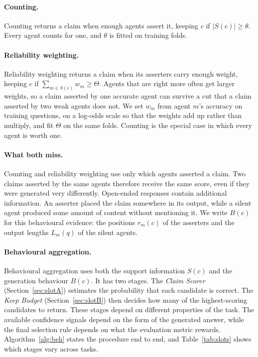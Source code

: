 \documentclass{article}
\begin{document}
\paragraph{Counting.}
Counting returns a claim when enough agents assert it, keeping $c$ if
$|S(c)| \geq \theta$. Every agent counts for one, and $\theta$ is fitted on training
folds.

\paragraph{Reliability weighting.}
Reliability weighting returns a claim when its asserters carry enough weight, keeping
$c$ if $\sum_{m \in S(c)} w_m \geq \Theta$. Agents that are right more often get larger
weights, so a claim asserted by one accurate agent can survive a cut that a claim
asserted by two weak agents does not. We set $w_m$ from agent $m$'s accuracy on training
questions, on a log-odds scale so that the weights add up rather than multiply, and fit
$\Theta$ on the same folds. Counting is the special case in which every agent is
worth one.

\paragraph{What both miss.}
Counting and reliability weighting use only which agents asserted a claim. Two claims
asserted by the same agents therefore receive the same score, even if they were generated
very differently. Open-ended responses contain additional information. An asserter placed
the claim somewhere in its output, while a silent agent produced some amount of content
without mentioning it. We write $B(c)$ for this behavioural evidence: the positions
$r_m(c)$ of the asserters and the output lengths $L_m(q)$ of the silent agents.

\paragraph{Behavioural aggregation.}
Behavioural aggregation uses both the support information $S(c)$ and the generation
behaviour $B(c)$. It has two stages. The \emph{Claim Scorer}
(Section~\ref{sec:slotA}) estimates the probability that each candidate is correct. The
\emph{Keep Budget} (Section~\ref{sec:slotB}) then decides how many of the highest-scoring
candidates to return. These stages depend on different properties of the task. The
available confidence signals depend on the form of the generated answer, while the final
selection rule depends on what the evaluation metric rewards. Algorithm~\ref{alg:beh} states the procedure end to end, and Table~\ref{tab:slots} shows which stages vary across tasks.
\end{document}
